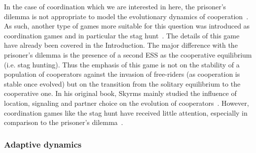             In the case of coordination which we are interested in here, the prisoner's dilemma is not appropriate to model the evolutionary dynamics of cooperation~\parencite{Alvard2002, Skyrms2004}. As such, another type of games more suitable for this question was introduced as coordination games and in particular the stag hunt~\parencite{Skyrms2004, Requejo2013a}. The details of this game have already been covered in the Introduction. The major difference with the prisoner's dilemma is the presence of a second ESS as the cooperative equilibrium (i.e. stag hunting). Thus the emphasis of this game is not on the stability of a population of cooperators against the invasion of free-riders (as cooperation is stable once evolved) but on the transition from the solitary equilibrium to the cooperative one. In his original book, Skyrms mainly studied the influence of location, signaling and partner choice on the evolution of cooperators~\parencite{Skyrms2004}. However, coordination games like the stag hunt have received little attention, especially in comparison to the prisoner's dilemma~\parencite{Iyer2016}.



        \subsubsection{Adaptive dynamics}

